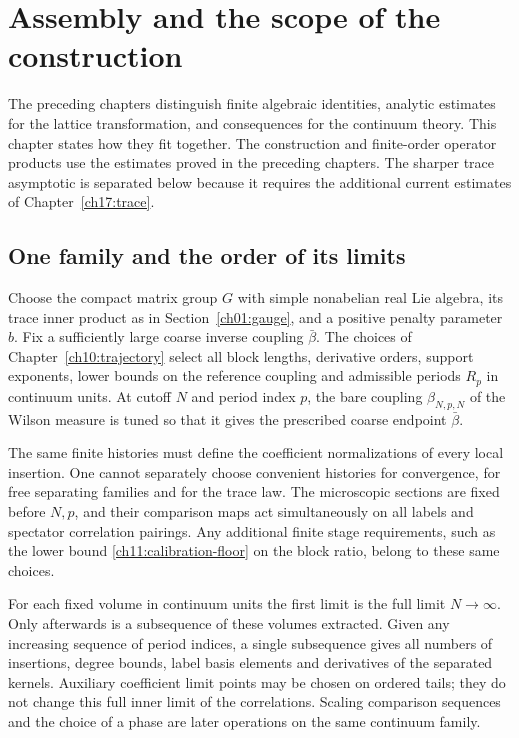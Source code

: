 \chapter{Assembly and the scope of the construction}
\label{ch19:assembly}

The preceding chapters distinguish finite algebraic identities, analytic
estimates for the lattice transformation, and consequences for the
continuum theory. This chapter states how they fit together. The construction and finite-order operator products use the estimates
proved in the preceding chapters. The sharper trace asymptotic is
separated below because it requires the additional current estimates
of Chapter~\ref{ch17:trace}.

\section{One family and the order of its limits}
\label{ch19:family}

Choose the compact matrix group $G$ with simple nonabelian real Lie
algebra, its trace inner product as in Section~\ref{ch01:gauge}, and a
positive penalty parameter $b$. Fix a sufficiently large coarse inverse
coupling $\bar\beta$. The choices of
Chapter~\ref{ch10:trajectory} select all block lengths, derivative
orders, support exponents, lower bounds on the reference coupling and admissible
periods $R_p$ in continuum units. At cutoff $N$ and period index $p$, the bare coupling $\beta_{N,p,N}$ of the
Wilson measure is tuned so that it gives the prescribed
coarse endpoint $\bar\beta$.

The same finite histories must define the coefficient normalizations
of every local insertion. One cannot separately choose convenient
histories for convergence, for free separating families and for the trace law.
The microscopic sections are fixed before $N,p$, and their comparison
maps act simultaneously on all labels and spectator correlation pairings. Any additional
finite stage requirements, such as the lower bound \eqref{ch11:calibration-floor} on the block ratio,
belong to these same choices.

For each fixed volume in continuum units the first limit is the full limit
$N\to\infty$. Only afterwards is a subsequence of these volumes
extracted. Given any increasing sequence of period indices, a single
subsequence gives all numbers of insertions, degree bounds, label basis elements and
derivatives of the separated kernels. Auxiliary coefficient limit points
may be chosen on ordered tails; they do not change this full inner
limit of the correlations. Scaling comparison sequences and the choice
of a phase are later operations on the same continuum family.

